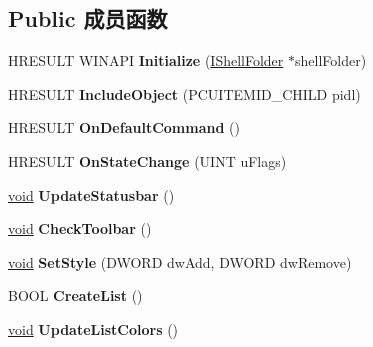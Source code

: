 \subsection*{Public 成员函数}
\begin{DoxyCompactItemize}
\item 
\mbox{\label{class_c_def_view_a845f7a6a571cb103f01f23fe1578fc16}} 
H\+R\+E\+S\+U\+LT W\+I\+N\+A\+PI {\bfseries Initialize} (\hyperlink{interface_i_shell_folder}{I\+Shell\+Folder} $\ast$shell\+Folder)
\item 
\mbox{\label{class_c_def_view_a4ab13687ea06fc9985df9a23da2f8956}} 
H\+R\+E\+S\+U\+LT {\bfseries Include\+Object} (P\+C\+U\+I\+T\+E\+M\+I\+D\+\_\+\+C\+H\+I\+LD pidl)
\item 
\mbox{\label{class_c_def_view_add52060486afc0f065ba07b0b854ffb2}} 
H\+R\+E\+S\+U\+LT {\bfseries On\+Default\+Command} ()
\item 
\mbox{\label{class_c_def_view_a15c38b54578f10e3a840927ba43eb0af}} 
H\+R\+E\+S\+U\+LT {\bfseries On\+State\+Change} (U\+I\+NT u\+Flags)
\item 
\mbox{\label{class_c_def_view_a27ad5790c2e6f73af00516b5e4bb20d2}} 
\hyperlink{interfacevoid}{void} {\bfseries Update\+Statusbar} ()
\item 
\mbox{\label{class_c_def_view_a4841d771bfe0da2f9856da5efbda1bd4}} 
\hyperlink{interfacevoid}{void} {\bfseries Check\+Toolbar} ()
\item 
\mbox{\label{class_c_def_view_a5cd1eeb5d062d397e158209335baef10}} 
\hyperlink{interfacevoid}{void} {\bfseries Set\+Style} (D\+W\+O\+RD dw\+Add, D\+W\+O\+RD dw\+Remove)
\item 
\mbox{\label{class_c_def_view_a33dcd2ef767370e77cc3f2fd97fbb861}} 
B\+O\+OL {\bfseries Create\+List} ()
\item 
\mbox{\label{class_c_def_view_a3497bbc206c3494956445fea6aac2553}} 
\hyperlink{interfacevoid}{void} {\bfseries Update\+List\+Colors} ()
\item 
\mbox{\label{class_c_def_view_ad3b93775557df11c9c87bc59ac2501b8}} 

\end{DoxyCompactItemize}

